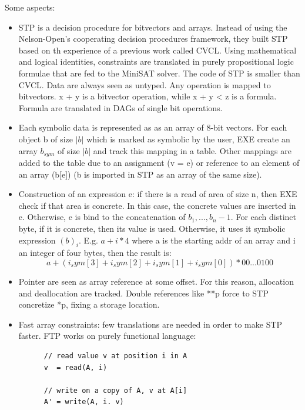 \documentclass[10pt, a4paper]{article}
\begin{document}
Some aspects:
\begin{itemize}
  
  \item STP is a decision procedure for bitvectors and arrays. Instead of using the Nelson-Open's cooperating decision procedures framework, they built STP based on th experience of a previous work called CVCL. Using mathematical and logical identities, constraints are translated in purely propositional logic formulae that are fed to the MiniSAT solver. The code of STP is smaller than CVCL. Data are always seen as untyped. Any operation is mapped to bitvectors. x + y is a bitvector operation, while x + y < z is a formula. Formula are translated in DAGs of single bit operations. 

  \item Each symbolic data is represented as as an array of 8-bit vectors. For each object b of size $|b|$ which is marked as symbolic by the user, EXE create an array $b_{sym}$ of size $|b|$ and track this mapping in a table. Other mappings are added to the table due to an assignment (v = e) or reference to an element of an array (b[e]) (b is imported in STP as an array of the same size).

  \item Construction of an expression e: if there is a read of area of size n, then EXE check if that area is concrete. In this case, the concrete values are inserted in e. Otherwise, e is bind to the concatenation of $b_1,..., b_n-1$. For each distinct byte, if it is concrete, then its value is used. Otherwise, it uses it symbolic expression $(b)_i$. E.g.  $a + i*4$ where a is the starting addr of an array and i an integer of four bytes, then the result is:
    \[ a + (i_sym[3] + i_sym[2] + i_sym[1] + i_sym[0]) * 00...0100 \]

  \item Pointer are seen as array reference at some offset. For this reason, allocation and deallocation are tracked. Double references like **p force to STP concretize *p, fixing a storage location.

  \item Fast array constraints: few translations are needed in order to make STP faster. FTP works on purely functional language:
    \begin{lstlisting}
      // read value v at position i in A
      v  = read(A, i)      
      
      // write on a copy of A, v at A[i]
      A' = write(A, i. v)  
      

\end{lstlisting}
\end{itemize}
\end{document}
